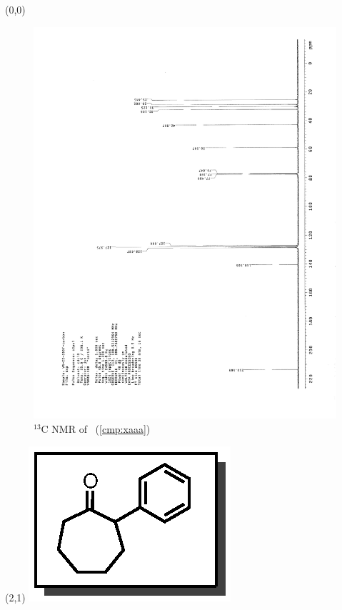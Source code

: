 \clearpage
\begin{textblock}{20}(0,0)
\begin{figure}[htb]
\caption{$^{13}$C NMR of  \CMPxaaa\ (\ref{cmp:xaaa})}
\includegraphics[scale=0.75, trim = 0mm 0mm 0mm 5mm,
clip]{chp_asymmetric/images/nmr/xaaaC}
\vspace{-100pt}
\end{figure}
\end{textblock}
\begin{textblock}{1}(2,1)
\includegraphics[scale=0.8, angle=90]{chp_asymmetric/images/xaaa}
\end{textblock}
\clearpage

